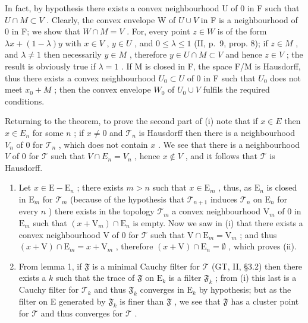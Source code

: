In fact, by hypothesis there exists a convex neighbourhood U of 0 in F such that \(U \cap M \subset V\) . Clearly, the convex envelope W of \(U \cup V\) in F is a neighbourhood of 0 in F; we show that \(W \cap M = V\) . For, every point \(z \in W\) is of the form \(\lambda x + (1 - \lambda)y\) with \(x \in V\) , \(y \in U\) , and \(0 \leqslant \lambda \leqslant 1\) (II, p.~9, prop. 8); if \(z \in M\) , and \(\lambda \neq 1\) then necessarily \(y \in M\) , therefore \(y \in U \cap M \subset V\) and hence \(z \in V\) ; the result is obviously true if \(\lambda = 1\) . If M is closed in F, the space F/M is Hausdorff, thus there exists a convex neighbourhood \(U_0 \subset U\) of 0 in F such that \(U_0\) does not meet \(x_0 + M\) ; then the convex envelope \(W_0\) of \(U_0 \cup V\) fulfils the required conditions.

Returning to the theorem, to prove the second part of (i) note that if \(x \in E\) then \(x \in E_n\) for some \(n\) ; if \(x \neq 0\) and \(\mathcal{T}_n\) is Hausdorff then there is a neighbourhood \(V_n\) of 0 for \(\mathcal{T}_n\) , which does not contain \(x\) . We see that there is a neighbourhood \(V\) of 0 for \(\mathcal{T}\) such that \(V \cap E_n = V_n\) , hence \(x \notin V\) , and it follows that \(\mathcal{T}\) is Hausdorff.

\begin{enumerate}
\def\labelenumi{(\roman{enumi})}
\setcounter{enumi}{1}
\item
  Let \(x \in \mathrm{E} - \mathrm{E}_n\) ; there exists \(m > n\) such that \(x \in \mathrm{E}_m\) , thus, as \(\mathrm{E}_n\) is closed in \(\mathrm{E}_m\) for \(\mathcal{T}_m\) (because of the hypothesis that \(\mathcal{T}_{n+1}\) induces \(\mathcal{T}_n\) on \(\mathrm{E}_n\) for every \(n\) ) there exists in the topology \(\mathcal{T}_m\) a convex neighbourhood \(\mathrm{V}_m\) of 0 in \(\mathrm{E}_m\) such that \((x + \mathrm{V}_m) \cap \mathrm{E}_n\) is empty. Now we saw in (i) that there exists a convex neighbourhood \(\mathrm{V}\) of 0 for \(\mathcal{T}\) such that \(\mathrm{V} \cap \mathrm{E}_m = \mathrm{V}_m\) ; and thus \((x + \mathrm{V}) \cap \mathrm{E}_m = x + \mathrm{V}_m\) , therefore \((x + \mathrm{V}) \cap \mathrm{E}_n = \emptyset\) , which proves (ii).
\item
  From lemma 1, if \(\mathfrak{F}\) is a minimal Cauchy filter for \(\mathcal{T}\) (GT, II, §3.2) then there exists a \(k\) such that the trace of \(\mathfrak{F}\) on \(\mathrm{E}_k\) is a filter \(\mathfrak{F}_k\) ; from (i) this last is a Cauchy filter for \(\mathcal{T}_k\) and thus \(\mathfrak{F}_k\) converges in \(\mathrm{E}_k\) by hypothesis; but as the filter on E generated by \(\mathfrak{F}_k\) is finer than \(\mathfrak{F}\) , we see that \(\mathfrak{F}\) has a cluster point for \(\mathcal{T}\) and thus converges for \(\mathcal{T}\) .
\end{enumerate}

